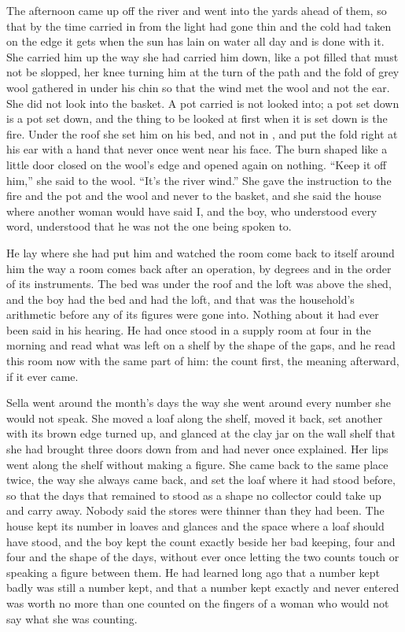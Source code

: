The afternoon came up off the river and went into the yards ahead of them, so that by the time  carried  in from  the light had gone thin and the cold had taken on the edge it gets when the sun has lain on water all day and is done with it. She carried him up  the way she had carried him down, like a pot filled that must not be slopped, her knee turning him at the turn of the path and the fold of grey wool gathered in under his chin so that the wind met the wool and not the ear. She did not look into the basket. A pot carried is not looked into; a pot set down is a pot set down, and the thing to be looked at first when it is set down is the fire. Under the roof she set him on his bed, and not in , and put the fold right at his ear with a hand that never once went near his face. The burn shaped like a little door closed on the wool's edge and opened again on nothing. “Keep it off him,” she said to the wool. “It's the river wind.” She gave the instruction to the fire and the pot and the wool and never to the basket, and she said the house where another woman would have said I, and the boy, who understood every word, understood that he was not the one being spoken to.

He lay where she had put him and watched the room come back to itself around him the way a room comes back after an operation, by degrees and in the order of its instruments. The bed was under the roof and the loft was above the shed, and the boy had the bed and  had the loft, and that was the household's arithmetic before any of its figures were gone into. Nothing about it had ever been said in his hearing. He had once stood in a supply room at four in the morning and read what was left on a shelf by the shape of the gaps, and he read this room now with the same part of him: the count first, the meaning afterward, if it ever came.

Sella went around the month's days the way she went around every number she would not speak. She moved a loaf along the shelf, moved it back, set another with its brown edge turned up, and glanced at the clay jar on the wall shelf that she had brought three doors down from  and had never once explained. Her lips went along the shelf without making a figure. She came back to the same place twice, the way she always came back, and set the loaf where it had stood before, so that the days that remained to  stood as a shape no collector could take up and carry away. Nobody said the stores were thinner than they had been. The house kept its number in loaves and glances and the space where a loaf should have stood, and the boy kept the count exactly beside her bad keeping, four and four and the shape of the days, without ever once letting the two counts touch or speaking a figure between them. He had learned long ago that a number kept badly was still a number kept, and that a number kept exactly and never entered was worth no more than one counted on the fingers of a woman who would not say what she was counting.

